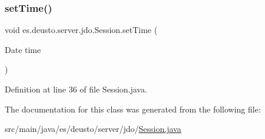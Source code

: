 \subsubsection{\texorpdfstring{setTime()}{setTime()}}
{\footnotesize\ttfamily void es.\+deusto.\+server.\+jdo.\+Session.\+set\+Time (\begin{DoxyParamCaption}\item[{Date}]{time }\end{DoxyParamCaption})}



Definition at line 36 of file Session.\+java.



The documentation for this class was generated from the following file\+:\begin{DoxyCompactItemize}
\item 
src/main/java/es/deusto/server/jdo/\mbox{\hyperlink{_session_8java}{Session.\+java}}\end{DoxyCompactItemize}
